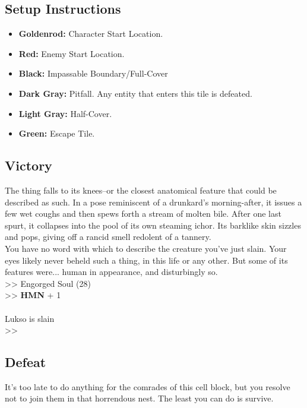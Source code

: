 \subsection*{Setup Instructions}
\begin{itemize}
\item \textbf{Goldenrod:} Character Start Location.
\item \textbf{Red:} Enemy Start Location.
\item \textbf{Black:} Impassable Boundary/Full-Cover
\item \textbf{Dark Gray:} Pitfall. Any entity that enters this tile is defeated.
\item \textbf{Light Gray:} Half-Cover.
\item \textbf{Green:} Escape Tile.
\end{itemize}

\pagebreak

\subsection*{Victory}
The thing falls to its knees--or the closest anatomical feature that could be described as such. In a pose reminiscent of a drunkard’s morning-after, it issues a few wet coughs and then spews forth a stream of molten bile. After one last spurt, it collapses into the pool of its own steaming ichor. Its barklike skin sizzles and pops, giving off a rancid smell redolent of a tannery.\\

You have no word with which to describe the creature you’ve just slain. Your eyes likely never beheld such a thing, in this life or any other. But some of its features were... human in appearance, and disturbingly so.\\

>> Engorged Soul (28)\\
>> \textbf{HMN} + 1\\
\\
 Lukso is slain\\
>> 

\subsection*{Defeat}

It's too late to do anything for the comrades of this cell block, but you resolve not to join them in that horrendous nest. The least you can do is survive.\\

